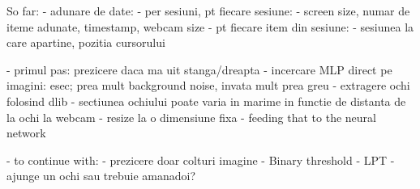 So far:
    - adunare de date:
        - per sesiuni, pt fiecare sesiune:
            - screen size, numar de iteme adunate, timestamp, webcam size
        - pt fiecare item din sesiune:
            - sesiunea la care apartine, pozitia cursorului
    
    - primul pas: prezicere daca ma uit stanga/dreapta
    - incercare MLP direct pe imagini: esec; prea mult background noise, invata mult prea greu
    - extragere ochi folosind dlib
        - sectiunea ochiului poate varia in marime in functie de distanta de la ochi la webcam
        - resize la o dimensiune fixa
        - feeding that to the neural network
    
    - to continue with:
    - prezicere doar colturi imagine
    - Binary threshold
    - LPT
    - ajunge un ochi sau trebuie amanadoi?